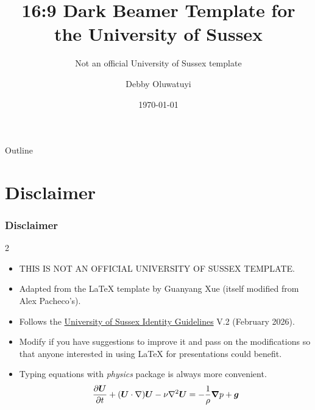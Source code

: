 \documentclass[11pt,t,aspectratio=169]{beamer}
\title{16:9 Dark Beamer Template for the University of Sussex}
\subtitle{Not an official University of Sussex template}
\author{Debby Oluwatuyi}
\institute{University of Sussex}
\date{\today}
\begin{document}
\begin{frame}
    \titlepage
\end{frame}

\begin{frame}[c]{Outline}
    \tableofcontents
\end{frame}

\section{Disclaimer}
\begin{frame}[c]
\frametitle{Disclaimer}
    \begin{multicols}{2}
    \begin{itemize}
        \item THIS IS NOT AN OFFICIAL UNIVERSITY OF SUSSEX TEMPLATE.
        \item Adapted from the \LaTeX{} template by Guanyang Xue (itself modified from Alex Pacheco's).
        \item Follows the \href{https://www.sussex.ac.uk/webteam/gateway/file.php?name=uos-11932---logo-and-updated-guidelines-ac6.pdf&site=514}{\color{usalbionblue}University of Sussex Identity Guidelines} V.2 (February 2026).
        \item Modify if you have suggestions to improve it and pass on the modifications so that anyone interested in using \LaTeX{} for presentations could benefit.
        \end{itemize}
    \end{multicols}
    \begin{itemize}
        \item Typing equations with \emph{physics} package is always more convenient.
        $$\pdv{\vb*{U}}{t}+(\vb*{U}\cdot\nabla)\vb*{U}-\nu\laplacian\vb*{U} =-\frac{1}{\rho }\grad p+\vb*{g}$$
    \end{itemize}
\end{frame}
\end{document}
